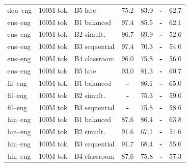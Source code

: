 \begin{table}[t]
\begin{tabular}{lll cc cc}
deu--eng  & 100M tok & B5 late & \cellcolor[rgb]{0.861,1.000,0.861} 75.2 & \cellcolor[rgb]{0.820,1.000,0.820} 83.0 & \textbf{-} & \cellcolor[rgb]{0.895,1.000,0.895} 62.7 \\
eus--eng & 100M tok & B1 balanced & \cellcolor[rgb]{0.738,1.000,0.738} 97.4 & \cellcolor[rgb]{0.806,1.000,0.806} 85.5 & \textbf{-} & \cellcolor[rgb]{0.900,1.000,0.900} 62.1 \\
eus--eng & 100M tok & B2 simult. & \cellcolor[rgb]{0.742,1.000,0.742} 96.7 & \cellcolor[rgb]{0.891,1.000,0.891} 69.9 & \textbf{-} & \cellcolor[rgb]{0.979,1.000,0.979} 52.6 \\
eus--eng & 100M tok & B3 sequential & \cellcolor[rgb]{0.738,1.000,0.738} 97.4 & \cellcolor[rgb]{0.889,1.000,0.889} 70.3 & \textbf{-} & \cellcolor[rgb]{0.967,1.000,0.967} 54.0 \\
eus--eng  & 100M tok & B4 classroom & \cellcolor[rgb]{0.745,1.000,0.745} 96.0 & \cellcolor[rgb]{0.859,1.000,0.859} 75.8 & \textbf{-} & \cellcolor[rgb]{0.951,1.000,0.951} 56.0 \\
eus--eng  & 100M tok & B5 late & \cellcolor[rgb]{0.762,1.000,0.762} 93.0 & \cellcolor[rgb]{0.829,1.000,0.829} 81.3 & \textbf{-} & \cellcolor[rgb]{0.912,1.000,0.912} 60.7 \\
fil--eng & 100M tok & B1 balanced & \textbf{-} & \cellcolor[rgb]{0.803,1.000,0.803} 86.1 & \textbf{-} & \cellcolor[rgb]{0.877,1.000,0.877} 65.0 \\
fil--eng & 100M tok & B2 simult. & \textbf{-} & \cellcolor[rgb]{0.862,1.000,0.862} 75.3 & \textbf{-} & \cellcolor[rgb]{0.926,1.000,0.926} 59.0 \\
fil--eng & 100M tok & B3 sequential & \textbf{-} & \cellcolor[rgb]{0.859,1.000,0.859} 75.8 & \textbf{-} & \cellcolor[rgb]{0.929,1.000,0.929} 58.6 \\
hin--eng & 100M tok & B1 balanced & \cellcolor[rgb]{0.792,1.000,0.792} 87.6 & \cellcolor[rgb]{0.801,1.000,0.801} 86.4 & \textbf{-} & \cellcolor[rgb]{0.886,1.000,0.886} 63.8 \\
hin--eng & 100M tok & B2 simult. & \cellcolor[rgb]{0.770,1.000,0.770} 91.6 & \cellcolor[rgb]{0.907,1.000,0.907} 67.1 & \textbf{-} & \cellcolor[rgb]{0.962,1.000,0.962} 54.6 \\
hin--eng & 100M tok & B3 sequential & \cellcolor[rgb]{0.769,1.000,0.769} 91.7 & \cellcolor[rgb]{0.900,1.000,0.900} 68.4 & \textbf{-} & \cellcolor[rgb]{0.959,1.000,0.959} 55.0 \\
hin--eng  & 100M tok & B4 classroom & \cellcolor[rgb]{0.792,1.000,0.792} 87.6 & \cellcolor[rgb]{0.859,1.000,0.859} 75.8 & \textbf{-} & \cellcolor[rgb]{0.940,1.000,0.940} 57.3 \\

\end{tabular}
\end{table}
